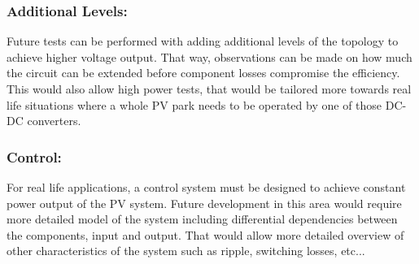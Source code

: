 \subsubsection{Additional Levels:}
Future tests can be performed with adding additional levels of the topology to achieve higher voltage output.
That way, observations can be made on how much the circuit can be extended before component losses compromise the efficiency.
This would also allow high power tests, that would be tailored more towards real life situations where a whole PV park needs to be operated by one of those DC-DC converters.

\subsubsection{Control:}
For real life applications, a control system must be designed to achieve constant power output of the PV system. Future development in this area would require more detailed model of the system including differential dependencies between the components, input and output. That would allow more detailed overview of other characteristics of the system such as ripple, switching losses, etc...
